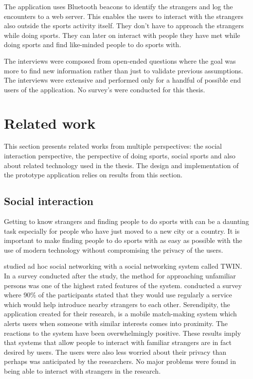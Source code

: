 The application uses Bluetooth beacons to identify the strangers and log the encounters to a web server. This enables the users to interact with the strangers also outside the sports activity itself. They don't have to approach the strangers while doing sports. They can later on interact with people they have met while doing sports and find like-minded people to do sports with. 

The interviews were composed from open-ended questions where the goal was more to find new information rather than just to validate previous assumptions. The interviews were extensive and performed only for a handful of possible end users of the application. No survey's were conducted for this thesis.
\clearpage

\section{Related work}

This section presents related works from multiple perspectives: the social interaction perspective, the perspective of doing sports, social sports and also about related technology used in the thesis. The design and implementation of the prototype application relies on results from this section.

\subsection{Social interaction}

Getting to know strangers and finding people to do sports with can be a daunting task especially for people who have just moved to a new city or a country. It is important to make finding people to do sports with as easy as possible with the use of modern technology without compromising the privacy of the users.

\cite{socialAdHoc} studied ad hoc social networking with a social networking system called TWIN. In a survey conducted after the study, the method for approaching unfamiliar persons was one of the highest rated features of the system. \cite{mobileMatchmaking} conducted a survey where 90\% of the participants stated that they would use regularly a service which would help introduce nearby strangers to each other. Serendipity, the application created for their research, is a mobile match-making system which alerts users when someone with similar interests comes into proximity. The reactions to the system have been overwhelmingly positive. These results imply that systems that allow people to interact with familiar strangers are in fact desired by users. The users were also less worried about their privacy than perhaps was anticipated by the researchers. No major problems were found in being able to interact with strangers in the research.

